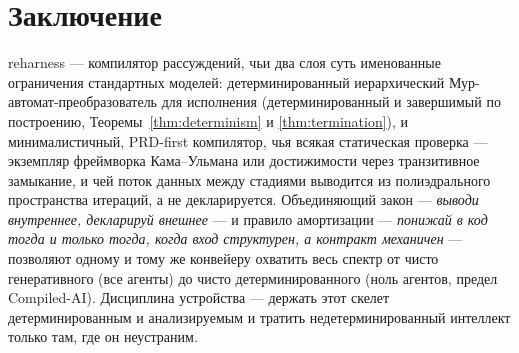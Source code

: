 \documentclass[11pt]{article}
\theoremstyle{plain}
\theoremstyle{definition}
\theoremstyle{remark}
\newcommand{\reharness}{\textsf{reharness}}
\begin{document}
\section{Заключение}

\reharness{} --- компилятор рассуждений, чьи два слоя суть именованные ограничения
стандартных моделей: детерминированный иерархический Мур-автомат-преобразователь для
исполнения (детерминированный и завершимый по построению,
Теоремы~\ref{thm:determinism} и \ref{thm:termination}), и минималистичный, PRD-first
компилятор, чья всякая статическая проверка --- экземпляр фреймворка Кама--Ульмана или
достижимости через транзитивное замыкание, и чей поток данных между стадиями выводится из
полиэдрального пространства итераций, а не декларируется. Объединяющий закон ---
\emph{выводи внутреннее, декларируй внешнее} --- и правило амортизации --- \emph{понижай в
код тогда и только тогда, когда вход структурен, а контракт механичен} --- позволяют
одному и тому же конвейеру охватить весь спектр от чисто генеративного (все агенты) до
чисто детерминированного (ноль агентов, предел Compiled-AI). Дисциплина устройства ---
держать этот скелет детерминированным и анализируемым и тратить недетерминированный
интеллект только там, где он неустраним.
\end{document}

